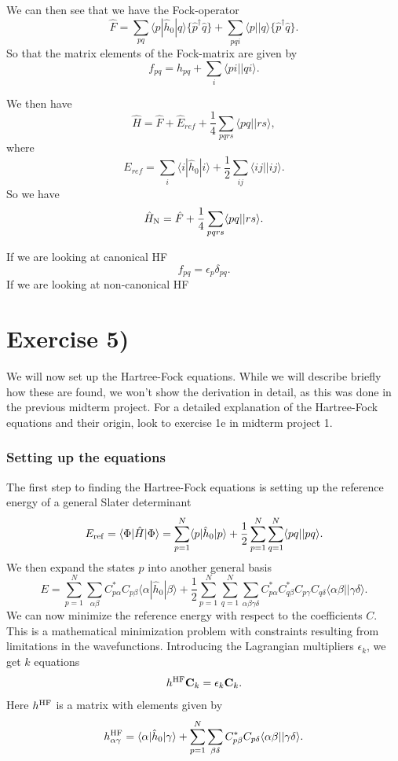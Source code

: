 \documentclass[a4paper, 11pt, notitlepage, english]{article}
\newcommand{\braket}[2]{\langle #1 | #2 \rangle}
\newcommand{\brakket}[2]{\langle #1 || #2 \rangle}
\newcommand{\op}[1]{\hat{#1}}
\newcommand{\braopket}[3]{\langle #1 | {#2} | #3 \rangle}
\newcommand{\eps}{\epsilon}
\begin{document}
We can then see that we have the Fock-operator
$$\op{F} = \sum_{pq} \braopket{p}{\op{h}_0}{q}\{\op{p}^\dagger\op{q}\} + \sum_{pqi} \brakket{p}{q}\{\op{p}^\dagger\op{q}\}.$$
So that the matrix elements of the Fock-matrix are given by
$$f_{pq} = h_{pq} + \sum_{i}\brakket{pi}{qi}.$$

We then have
$$\op{H} = \op{F} + \op{E}_{ref} + \frac{1}{4}\sum_{pqrs}\brakket{pq}{rs},$$
where
$$E_{ref} = \sum_i \braopket{i}{\op{h}_0}{i} + \frac{1}{2}\sum_{ij}\brakket{ij}{ij}.$$
So we have
$$\op{H}_{\rm N} = \op{F} + \frac{1}{4}\sum_{pqrs}\brakket{pq}{rs}.$$

If we are looking at canonical HF
$$f_{pq} = \eps_p \delta_{pq}.$$
If we are looking at non-canonical HF




\clearpage

\section*{Exercise 5)}

We will now set up the Hartree-Fock equations. While we will describe briefly how these are found, we won't show the derivation in detail, as this was done in the previous midterm project. For a detailed explanation of the Hartree-Fock equations and their origin, look to exercise 1e in midterm project 1.

\subsubsection*{Setting up the equations}

The first step to finding the Hartree-Fock equations is setting up the reference energy of a general Slater determinant
$$E_{\rm ref} = \braopket{\Phi}{\op{H}}{\Phi} = \sum_{p=1}^N \braopket{p}{\op{h}_0}{p} + \frac{1}{2}\sum_{p=1}^N\sum_{q=1}^N\braket{pq|}{pq}.$$
We then expand the states $p$ into another general basis
$$E = \sum_{p=1}^N \sum_{\alpha \beta} C^*_{p \alpha} C_{p \beta}\braopket{\alpha}{\op{h}_0}{\beta} + \frac{1}{2}\sum_{p=1}^N\sum_{q=1}^N\sum_{\alpha\beta\gamma\delta} C_{p\alpha}^* C_{q \beta}^* C_{p \gamma} C_{q \delta} \braket{\alpha\beta|}{\gamma\delta}.$$
We can now minimize the reference energy with respect to the coefficients $C$. This is a mathematical minimization problem with constraints resulting from limitations in the wavefunctions. Introducing the Lagrangian multipliers $\eps_k$, we get $k$ equations
$$h^{\rm HF} \mathbf{C}_k = \eps_k \mathbf{C}_k.$$
Here $h^{\rm HF}$ is a matrix with elements given by
$$h^{\rm HF}_{\alpha\gamma} = \braopket{\alpha}{\op{h}_0}{\gamma} + \sum_{p=1}^N\sum_{\beta\delta} C_{p\beta}^* C_{p \delta} \braket{\alpha\beta|}{\gamma\delta}.$$
\end{document}
